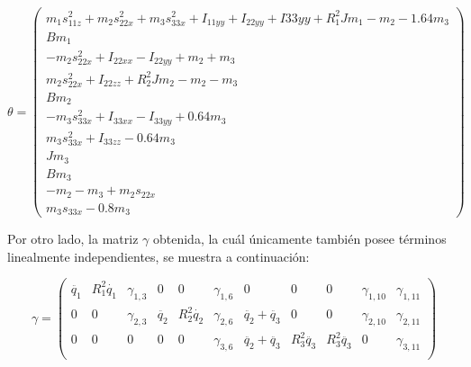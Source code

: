 \[
\theta=
\begin{pmatrix}
m_{1}s_{11z}^{2} + m_{2}s_{22x}^{2} + m_{3}s_{33x}^{2} + I_{11yy} + I_{22yy} + I{33yy} + R_{1}^{2}Jm_1 - m_2 - 1.64m_3 \\

Bm_{1}  \\

-m_{2}s_{22x}^{2} + I_{22xx} - I_{22yy} + m_{2} + m_{3} \\

m_{2}s_{22x}^{2} + I_{22zz} + R_{2}^{2}Jm_{2} - m_{2} - m_{3}  \\

Bm_{2} \\

- m_{3}s_{33x}^{2} + I_{33xx} - I_{33yy} + 0.64m_{3} \\

m_{3}s_{33x}^{2} + I_{33zz} - 0.64m_{3}  \\

Jm_{3}  \\

Bm_{3}  \\

-m_{2} -m_{3} + m_{2}s_{22x}  \\

m_{3}s_{33x} - 0.8m_{3}
\end{pmatrix}\]



\vspace{1cm}

Por otro lado, la matriz $\gamma$ obtenida, la cuál únicamente también posee términos linealmente independientes, se muestra a continuación:

\[
\gamma=
\begin{pmatrix}
\ddot{q_1} & R_{1}^{2}\dot{q_1} & \gamma_{1,3} & 0 & 0  & \gamma_{1,6} & 0 & 0 & 0 & \gamma_{1,10} & \gamma_{1,11} \\

0 & 0 & \gamma_{2,3} & \ddot{q_2} & R_{2}^{2}\dot{q_2} & \gamma_{2,6} & \ddot{q_2} + \ddot{q_3} & 0 & 0 & \gamma_{2,10} & \gamma_{2,11} \\

0 & 0 & 0 & 0 & 0 & \gamma_{3,6} & \ddot{q_2} + \ddot{q_3} & R_{3}^{2}\ddot{q_3} & R_{3}^{2}\ddot{q_3} & 0 & \gamma_{3,11} \\
\end{pmatrix} \] \vspace{0.3cm}



